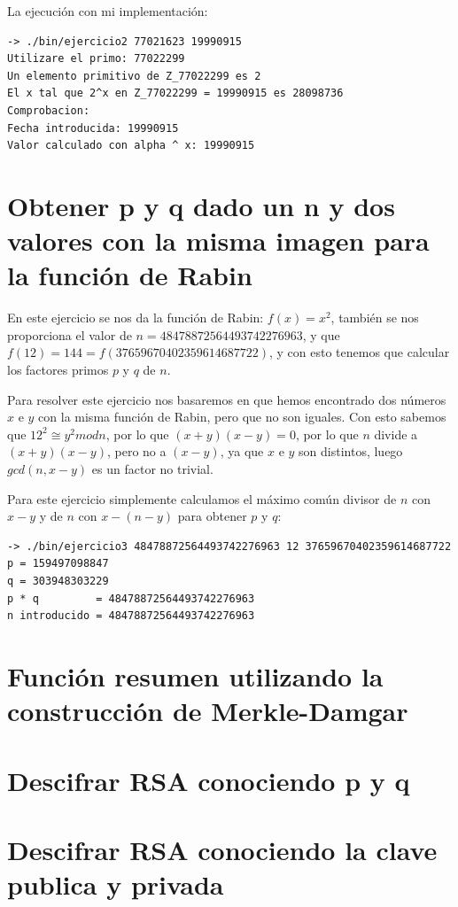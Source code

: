 \documentclass[12pt, spanish]{article}
\begin{document}
La ejecución con mi implementación:

\begin{lstlisting}
-> ./bin/ejercicio2 77021623 19990915
Utilizare el primo: 77022299
Un elemento primitivo de Z_77022299 es 2
El x tal que 2^x en Z_77022299 = 19990915 es 28098736
Comprobacion:
Fecha introducida: 19990915
Valor calculado con alpha ^ x: 19990915
\end{lstlisting}


\section{Obtener p y q dado un n y dos valores con la misma imagen para la función de Rabin}

En este ejercicio se nos da la función de Rabin: $f(x) = x^2$, también se nos proporciona el valor de $n = 48478872564493742276963$, y que $f (12) =144 = f (37659670402359614687722)$, y con esto tenemos que calcular los factores primos $p$ y $q$ de $n$.

Para resolver este ejercicio nos basaremos en que hemos encontrado dos números $x$ e $y$ con la misma función de Rabin, pero que no son iguales. Con esto sabemos que $12^2 \cong y^2 mod n$, por lo que $(x + y)(x - y) = 0$, por lo que $n$ divide a $(x + y)(x - y)$, pero no a $(x - y)$, ya que $x$ e $y$ son distintos, luego $gcd(n, x - y)$ es un factor no trivial.

Para este ejercicio simplemente calculamos el máximo común divisor de $n$ con $x - y$ y de $n$ con $x - (n - y)$ para obtener $p$ y $q$:

\begin{lstlisting}
-> ./bin/ejercicio3 48478872564493742276963 12 37659670402359614687722
p = 159497098847
q = 303948303229
p * q         = 48478872564493742276963
n introducido = 48478872564493742276963
\end{lstlisting}


\section{Función resumen utilizando la construcción de Merkle-Damgar}

\section{Descifrar RSA conociendo p y q}

\section{Descifrar RSA conociendo la clave publica y privada}
\end{document}
